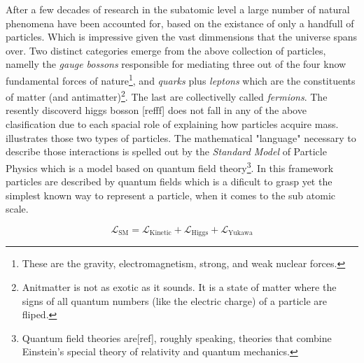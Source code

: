 After a few decades of research in the subatomic level a large number of natural phenomena have been accounted
for, based on the existance of only a handfull of particles. Which is impressive given the vast dimmensions that the
universe spans over. Two distinct categories emerge from the above collection of particles, namelly the {\it gauge
bossons} responsible for mediating three out of the four know fundamental forces of
nature\footnote{These are the gravity, electromagnetism, strong, and weak nuclear forces.}, and {\it quarks} plus {\it leptons} which are the
constituents of matter
(and antimatter)\footnote{Anitmatter is not as exotic as it sounds. It is a state of matter where the
signs of all quantum numbers (like the electric charge) of a particle are fliped.}. The last are collectivelly called {\it fermions}.
The resently discoverd higgs bosson [{\color{red}refff}] does not fall in any of the above clasification due to each spacial role of
explaining how particles acquire mass.  illustrates those two types of particles.
The mathematical "language" necessary to describe those interactions is spelled out by the \textit{Standard Model} of Particle Physics
which is a model based on quantum field
theory\footnote{Quantum field theories are[{\color{red}ref}], roughly speaking, theories that combine Einstein's special theory of
relativity and quantum mechanics.}.
In this framework particles are described by quantum fields which is a dificult to grasp yet the simplest known way to represent a particle,
when it comes to the sub atomic scale.

\begin{equation}
\mathscr{L}_{\text{SM}} =
\mathscr{L}_{\text{Kinetic}} + \mathscr{L}_{\text{Higgs}} + \mathscr{L}_{\text{Yukawa}}
\label{lagrangian}
\end{equation}


